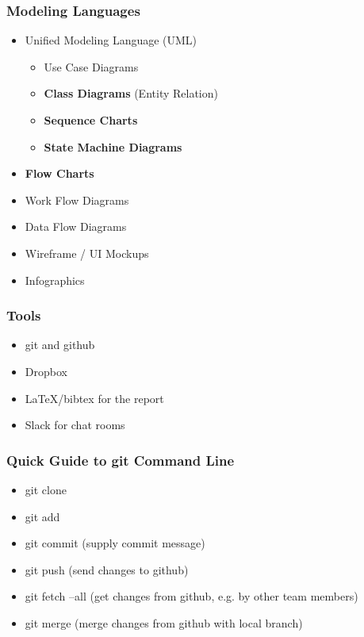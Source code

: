 \documentclass[hyperref={pdfpagelabels=false}, aspectratio=1610]{beamer}
\begin{document}
\begin{frame}
\frametitle{Modeling Languages}
\begin{block}{}
 \begin{itemize}
  \item Unified Modeling Language (UML)
  \begin{itemize}
	\item Use Case Diagrams
  	\item \textbf{Class Diagrams} (Entity Relation)
	\item \textbf{Sequence Charts}
	\item \textbf{State Machine Diagrams}
  \end{itemize}
  \item \textbf{Flow Charts}
  \item Work Flow Diagrams
  \item Data Flow Diagrams
  \item Wireframe / UI Mockups
  \item Infographics
 \end{itemize}
\end{block}
\end{frame}

\begin{frame}
\frametitle{Tools}
\begin{block}{}
 \begin{itemize}
  \item git and github
  \item Dropbox
  \item LaTeX/bibtex for the report
  \item Slack for chat rooms
 \end{itemize}
\end{block}
\end{frame}

\begin{frame}
\frametitle{Quick Guide to git Command Line}
\begin{block}{}
 \begin{itemize}
  \item git clone 
  \item git add 
  \item git commit \quad (supply commit message)
  \item git push \quad (send changes to github)
  \item git fetch --all \quad (get changes from github, e.g. by other team members)
  \item git merge \quad (merge changes from github with local branch)
 \end{itemize}
\end{block}
\end{frame}
\end{document}
